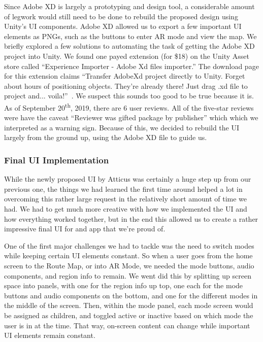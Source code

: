 \documentclass[a4paper, 10pt, american, titlepage]{article}
\begin{document}
Since Adobe XD is largely a prototyping and design tool, a considerable amount
of legwork would still need to be done to rebuild the proposed design using
Unity's UI components. Adobe XD allowed us to export a few important UI
elements as PNGs, such as the buttons to enter AR mode and view the map. We
briefly explored a few solutions to automating the task of getting the Adobe XD
project into Unity. We found one payed extension (for \$18) on the Unity Asset
store called ``Experience Importer - Adobe Xd files importer.'' The download
page for this extension claims ``Transfer AdobeXd project directly to Unity.
Forget about hours of positioning objects. They're already there! Just drag .xd
file to project and...  voila!''~\autocite{glasseye2019}.  We suspect this
sounds too good to be true because it is. As of September
20\textsuperscript{th}, 2019, there are 6 user reviews. All of the five-star
reviews were have the caveat ``Reviewer was gifted package by publisher'' which
which we interpreted as a warning sign. Because of this, we decided to rebuild
the UI largely from the ground up, using the Adobe XD file to guide us.

\subsubsection{Final UI Implementation}
\label{sec:finalUI}

While the newly proposed UI by Atticus was certainly a huge step up from
our previous one, the things we had learned the first time around helped
a lot in overcoming this rather large request in the relatively short amount
of time we had. We had to get much more creative with how we implemented the
UI and how everything worked together, but in the end this allowed us to 
create a rather impressive final UI for and app that we're proud of. 

One of the first major challenges we had to tackle was the need to switch
modes while keeping certain UI elements constant. So when a user goes from
the home screen to the Route Map, or into AR Mode, we needed the mode buttons,
audio components, and region info to remain. We went did this by splitting up
screen space into panels, with one for the region info up top, one each for the
mode buttons and audio components on the bottom, and one for the different 
modes in the middle of the screen. Then, within the mode panel, each mode 
screen would be assigned as children, and toggled active or inactive based on 
which mode the user is in at the time. That way, on-screen content can change
while important UI elements remain constant. 
\end{document}
